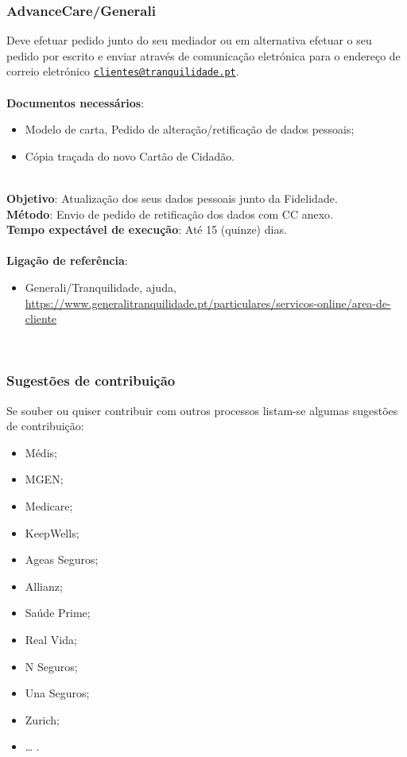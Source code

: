 \subsubsection{AdvanceCare/Generali}

Deve efetuar pedido junto do seu mediador ou em alternativa efetuar o
seu pedido por escrito e enviar através de comunicação eletrónica para o
endereço de correio eletrónico
\href{mailto:clientes@tranquilidade.pt}{\nolinkurl{clientes@tranquilidade.pt}}. \\
\\
\textbf{Documentos necessários}:
\begin{itemize}
	\item Modelo de carta, Pedido de alteração/retificação de dados pessoais;
	\item Cópia traçada do novo Cartão de Cidadão.
\end{itemize}
\leavevmode\\
\textbf{Objetivo}: Atualização dos seus dados pessoais junto da Fidelidade. \\
\textbf{Método}: Envio de pedido de retificação dos dados com CC anexo. \\
\textbf{Tempo expectável de execução}: Até 15 (quinze) dias. \\
\\
\textbf{Ligação de referência}:
\begin{itemize}
	\item Generali/Tranquilidade, ajuda, \url{https://www.generalitranquilidade.pt/particulares/servicos-online/area-de-cliente}
\end{itemize}
\leavevmode\\
\newpage

\subsubsection{Sugestões de contribuição}

Se souber ou quiser contribuir com outros processos listam-se algumas
sugestões de contribuição:
\begin{itemize}
	\item Médis;
	\item MGEN;
	\item Medicare;
	\item KeepWells;
	\item Ageas Seguros;
	\item Allianz;
	\item Saúde Prime;
	\item Real Vida;
	\item N Seguros;
	\item Una Seguros;
	\item Zurich;
	\item \ldots{} .
\end{itemize}

